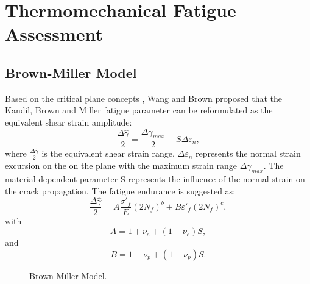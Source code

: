 \documentclass[preprint,5p,twocolumn,11pt,sort&compress]{elsarticle}
\begin{document}
\section{ Thermomechanical Fatigue Assessment}

\subsection{Brown-Miller Model}
Based on the critical plane concepts \cite{Brown2006}, Wang and Brown \cite{Wang1993} proposed that the Kandil, Brown and Miller fatigue parameter \cite{Kandil1982} can be reformulated as the equivalent shear strain amplitude:
\begin{equation}
\frac{{\Delta \hat \gamma }}{2} = \frac{{\Delta {\gamma _{max}}}}{2} + S\Delta {\varepsilon _n},
\label{Equ:ShearStrainBM}
\end{equation}
where $\frac{{\Delta \hat \gamma }}{2}$ is the equivalent shear strain range, $\Delta {\varepsilon _n}$ represents the normal strain excursion on the on the plane with the maximum strain range $\Delta {\gamma _{max}}$. The material dependent parameter S represents the influence of the normal strain on the crack propagation.
The fatigue endurance is suggested as:
\begin{equation}
\frac{{\Delta \hat \gamma }}{2} = A\frac{{{{\sigma '}_f}}}{E}{\left( {2{N_f}} \right)^b} + B{{\varepsilon '}_f}{\left( {2{N_f}} \right)^c},
\end{equation}
with
\[A = 1 + {\nu _e} + \left( {1 - {\nu _e}} \right)S,\]
and
\[B = 1 + {\nu _p} + \left( {1 - {\nu _p}} \right)S.\]
\begin{figure}[!htp]
\caption{Brown-Miller Model.}
\label{Fig:NF-NP-BM}
\end{figure}
\end{document}
